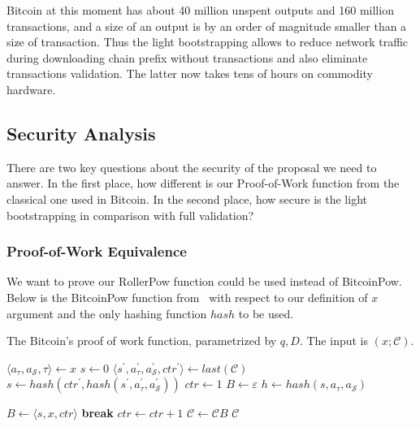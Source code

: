 \documentclass[conference,compsoc]{IEEEtran}
\begin{document}
Bitcoin at this moment has about 40 million unspent outputs and 160 million transactions, and a size of an output is by an order of magnitude smaller than a size of transaction. Thus the light bootstrapping allows to reduce network traffic during downloading chain prefix without transactions and also eliminate transactions validation. The latter now takes tens of hours on commodity hardware. 


\subsection{Security Analysis}
\label{protocol_props}

There are two key questions about the security of the proposal we need to answer. In the first place, how different is our Proof-of-Work function from the classical one used in Bitcoin. In the second place, how secure is the light bootstrapping in comparison with full validation? 

\subsubsection{Proof-of-Work Equivalence}

We want to prove our RollerPow function could be used instead of BitcoinPow. Below is the BitcoinPow function from~\cite{garay2015bitcoin} with respect to our definition of $x$ argument and the only hashing function $hash$ to be used.

\begin{algorithm}[H]
\caption{The Bitcoin's proof of work function, parametrized by \(q, D\). The input is \((x; \mathcal{C})\).}
\label{algo_bitcoin_pow}
\begin{algorithmic}[1]
\State $ \langle a_{\tau}, a_{\mathcal{S}}, \tau \rangle \gets x $
	\State $s \gets 0$
\Else
	\State $ \langle s^\prime, a_{\tau}^\prime, a_{\mathcal{S}}^\prime, ctr^\prime \rangle \gets last(\mathcal{C}) $
	\State $s \gets hash(ctr^\prime, hash(s^\prime, a_{\tau}^\prime, a_{\mathcal{S}}^\prime)) $
\EndIf
\State $ctr \gets 1 $
\State $B \gets \varepsilon$
\State $h \gets hash(s, a_{\tau}, a_{\mathcal{S}}) $

\State $B \gets \langle s, x, ctr \rangle$
\State \textbf{break}
\EndIf
\State $ctr \gets ctr + 1$
\EndWhile
\State $\mathcal{C} \gets \mathcal{C}B$
\State \Return $\mathcal{C}$
\EndFunction
\end{algorithmic}
\end{algorithm}
	
\end{document}
